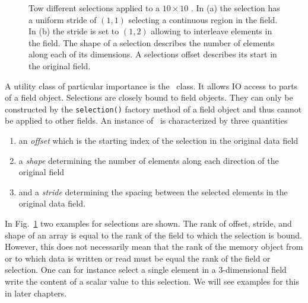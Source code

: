 \begin{figure}[tb]
\begin{minipage}[c]{0.32\linewidth}
{}
\end{minipage}
\hspace{0.01\linewidth}
\begin{minipage}[c]{0.3\linewidth}
\caption{{\small\label{fig:selection}
Tow different selections applied to a $10\times 10$ \nxfield.
In (a) the selection has a uniform stride of $(1,1)$ selecting a continuous
region in the field. In (b) the stride is set to $(1,2)$ allowing to interleave
elements in the field. The shape of a selection describes the number of elements
along each of its dimensions. A selections offset describes its start in the
original field.}}
\end{minipage}
\end{figure}
A utility class of particular importance is the \nxselection\ class. 
It allows IO access to parts of a field object. Selections are closely bound to
field objects. They can only be constructed by the {\tt selection()} factory
method of a field object and thus cannot be applied to other fields.
An instance of \nxselection\ is characterized by three quantities
\begin{enumerate}
    \item an {\em offset} which is the starting index of the selection in the
    original data field
    \item a {\em shape} determining the number of elements along each direction
    of the original field
    \item and a {\em stride} determining the spacing between the selected
    elements in the original data field.
\end{enumerate}
In Fig.~\ref{fig:selection} two examples for selections are shown. 
The rank of offset, stride, and shape of an array is equal to the rank of the
field to which the selection is bound. However, this does not necessarily mean
that the rank of the memory object from or to which data is written or read must
be equal the rank of the field or selection. 
One can for instance select a single element in a 3-dimensional field write the
content of a scalar value to this selection. 
We will see examples for this in later chapters.

